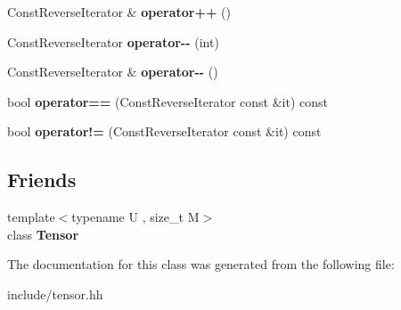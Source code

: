 \begin{DoxyCompactItemize}
\item 
Const\+Reverse\+Iterator \& {\bfseries operator++} ()\hypertarget{classtensor_1_1Tensor_3_01T_00_010_01_4_1_1ConstReverseIterator_ad20f15cb8d542eec56ad49c9672c3bdb}{}\label{classtensor_1_1Tensor_3_01T_00_010_01_4_1_1ConstReverseIterator_ad20f15cb8d542eec56ad49c9672c3bdb}

\item 
Const\+Reverse\+Iterator {\bfseries operator-\/-\/} (int)\hypertarget{classtensor_1_1Tensor_3_01T_00_010_01_4_1_1ConstReverseIterator_a0292fe0d1c31643ab691a06fa83c09be}{}\label{classtensor_1_1Tensor_3_01T_00_010_01_4_1_1ConstReverseIterator_a0292fe0d1c31643ab691a06fa83c09be}

\item 
Const\+Reverse\+Iterator \& {\bfseries operator-\/-\/} ()\hypertarget{classtensor_1_1Tensor_3_01T_00_010_01_4_1_1ConstReverseIterator_a2dd43f9075babfb529dc0d3ba7001a49}{}\label{classtensor_1_1Tensor_3_01T_00_010_01_4_1_1ConstReverseIterator_a2dd43f9075babfb529dc0d3ba7001a49}

\item 
bool {\bfseries operator==} (Const\+Reverse\+Iterator const \&it) const \hypertarget{classtensor_1_1Tensor_3_01T_00_010_01_4_1_1ConstReverseIterator_a1b5c0758353c578b7c38793db91d4719}{}\label{classtensor_1_1Tensor_3_01T_00_010_01_4_1_1ConstReverseIterator_a1b5c0758353c578b7c38793db91d4719}

\item 
bool {\bfseries operator!=} (Const\+Reverse\+Iterator const \&it) const \hypertarget{classtensor_1_1Tensor_3_01T_00_010_01_4_1_1ConstReverseIterator_a1ff3886ef8d31f1afdb55170fb11aaac}{}\label{classtensor_1_1Tensor_3_01T_00_010_01_4_1_1ConstReverseIterator_a1ff3886ef8d31f1afdb55170fb11aaac}

\end{DoxyCompactItemize}
\subsection*{Friends}
\begin{DoxyCompactItemize}
\item 
{\footnotesize template$<$typename U , size\+\_\+t M$>$ }\\class {\bfseries Tensor}\hypertarget{classtensor_1_1Tensor_3_01T_00_010_01_4_1_1ConstReverseIterator_af4a07134de1525172d3c60c57e8f1496}{}\label{classtensor_1_1Tensor_3_01T_00_010_01_4_1_1ConstReverseIterator_af4a07134de1525172d3c60c57e8f1496}

\end{DoxyCompactItemize}


The documentation for this class was generated from the following file\+:\begin{DoxyCompactItemize}
\item 
include/tensor.\+hh\end{DoxyCompactItemize}

